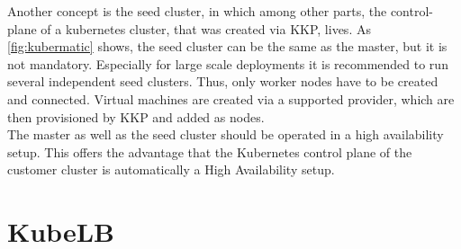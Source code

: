 Another concept is the seed cluster, in which among other parts, the control-plane of a kubernetes cluster, that was created via KKP, lives.
As \autoref{fig:kubermatic} shows, the seed cluster can be the same as the master, but it is not mandatory.
Especially for large scale deployments it is recommended to run several independent seed clusters.
Thus, only worker nodes have to be created and connected.
Virtual machines are created via a supported provider, which are then provisioned by KKP and added as nodes.
\\
The master as well as the seed cluster should be operated in a high availability setup.
This offers the advantage that the Kubernetes control plane of the customer cluster is automatically a High Availability setup.


\section{KubeLB}\label{sec:KubeLB}

